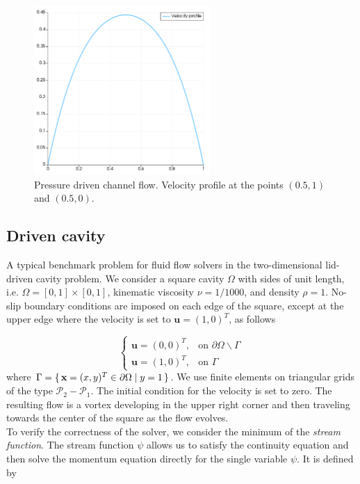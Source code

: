 \documentclass[a4paper,11pt,oneside]{book}
\begin{document}
\begin{figure}[h!]
\centering
\includegraphics[width=0.6\textwidth]{images/velocity_profile.pdf}
\caption{Pressure driven channel flow. Velocity profile at the points $(0.5, 1)$ and $(0.5, 0)$.}
\end{figure}

\subsection{Driven cavity}

A typical benchmark problem for fluid flow solvers in the two-dimensional lid-driven cavity problem. We consider a square cavity $\Omega$ with sides of unit length, i.e. $\Omega = [0,1] \times [0,1]$, kinematic viscosity $\nu = 1/1000$, and density $\rho = 1$. No-slip boundary conditions are imposed on each edge of the square, except at the upper edge where the velocity is set to $\mathbf{u} = (1,0)^T$, as follows

\[
\begin{cases}
\mathbf{u} = (0, 0)^T, & \mbox{on } \partial \Omega \backslash \Gamma \\
\mathbf{u} = (1, 0)^T, & \mbox{on } \Gamma
\end{cases}
\]
where $ \Gamma = \set{ \mathbf{x} = (x,y)^T \in \partial \Omega | y = 1}$. We use finite elements on triangular grids of the type $\mathcal{P}_2-\mathcal{P}_1$. The initial condition for the velocity is set to zero. The resulting flow is a vortex developing in the upper right corner and then traveling towards the center of the square as the flow evolves. \\
To verify the correctness of the solver, we consider the minimum of the \textit{stream function}. The stream function $\psi$ allows us to satisfy the continuity equation and then solve the momentum equation directly for the single variable $\psi$. It is defined by
\end{document}
